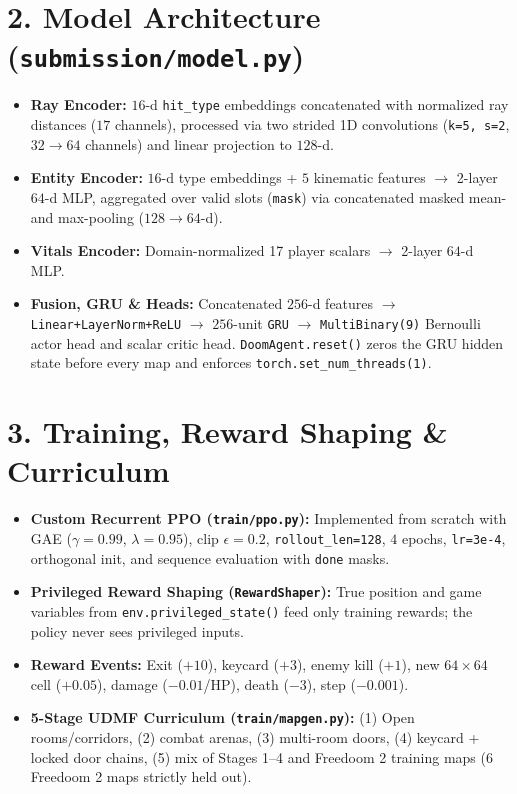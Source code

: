 \documentclass[10pt,twocolumn]{article}
\begin{document}
\section*{2. Model Architecture (\texttt{submission/model.py})}
\begin{itemize}
  \item \textbf{Ray Encoder:} $16$-d \texttt{hit\_type} embeddings concatenated with normalized ray distances ($17$ channels), processed via two strided 1D convolutions (\texttt{k=5, s=2}, $32\to 64$ channels) and linear projection to $128$-d.
  \item \textbf{Entity Encoder:} $16$-d type embeddings + $5$ kinematic features $\to$ 2-layer $64$-d MLP, aggregated over valid slots (\texttt{mask}) via concatenated masked mean- and max-pooling ($128\to 64$-d).
  \item \textbf{Vitals Encoder:} Domain-normalized 17 player scalars $\to$ 2-layer $64$-d MLP.
  \item \textbf{Fusion, GRU \& Heads:} Concatenated $256$-d features $\to$ \texttt{Linear+LayerNorm+ReLU} $\to$ $256$-unit \texttt{GRU} $\to$ \texttt{MultiBinary(9)} Bernoulli actor head and scalar critic head. \texttt{DoomAgent.reset()} zeros the GRU hidden state before every map and enforces \texttt{torch.set\_num\_threads(1)}.
\end{itemize}

\section*{3. Training, Reward Shaping \& Curriculum}
\begin{itemize}
  \item \textbf{Custom Recurrent PPO (\texttt{train/ppo.py}):} Implemented from scratch with GAE ($\gamma=0.99$, $\lambda=0.95$), clip $\epsilon=0.2$, \texttt{rollout\_len=128}, $4$ epochs, \texttt{lr=3e-4}, orthogonal init, and sequence evaluation with \texttt{done} masks.
  \item \textbf{Privileged Reward Shaping (\texttt{RewardShaper}):} True position and game variables from \texttt{env.privileged\_state()} feed only training rewards; the policy never sees privileged inputs.
  \item \textbf{Reward Events:} Exit ($+10$), keycard ($+3$), enemy kill ($+1$), new $64\times 64$ cell ($+0.05$), damage ($-0.01$/HP), death ($-3$), step ($-0.001$).
  \item \textbf{5-Stage UDMF Curriculum (\texttt{train/mapgen.py}):} (1) Open rooms/corridors, (2) combat arenas, (3) multi-room doors, (4) keycard + locked door chains, (5) mix of Stages 1--4 and Freedoom 2 training maps (6 Freedoom 2 maps strictly held out).
\end{itemize}
\end{document}
